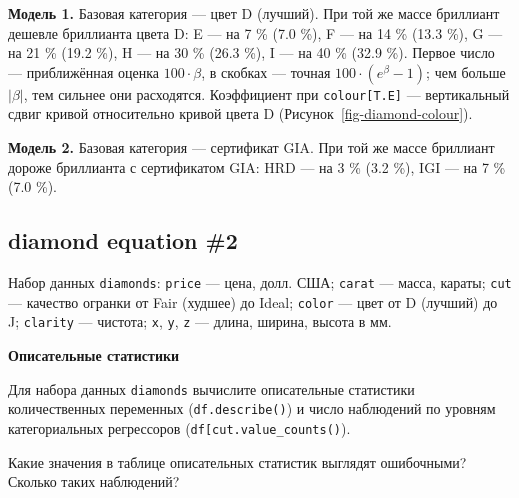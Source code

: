 \documentclass[
  russian,
]{article}
\begin{document}
\begin{tcolorbox}[enhanced jigsaw, arc=.35mm, bottomrule=.15mm, bottomtitle=1mm, breakable, colback=white, colbacktitle=quarto-callout-tip-color!10!white, colframe=quarto-callout-tip-color-frame, coltitle=black, left=2mm, leftrule=.75mm, opacityback=0, opacitybacktitle=0.6, rightrule=.15mm, title=\textcolor{quarto-callout-tip-color}{\faLightbulb}\hspace{0.5em}{Ответ}, titlerule=0mm, toprule=.15mm, toptitle=1mm]

\textbf{Модель 1.} Базовая категория --- цвет D (лучший). При той же
массе бриллиант дешевле бриллианта цвета D: E --- на 7 \% (7.0 \%), F
--- на 14 \% (13.3 \%), G --- на 21 \% (19.2 \%), H --- на 30 \% (26.3
\%), I --- на 40 \% (32.9 \%). Первое число --- приближённая оценка
\(100\cdot\beta\), в скобках --- точная \(100\cdot(e^{\beta}-1)\); чем
больше \(\lvert\beta\rvert\), тем сильнее они расходятся. Коэффициент
при \texttt{colour{[}T.E{]}} --- вертикальный сдвиг кривой относительно
кривой цвета D (Рисунок~\ref{fig-diamond-colour}).

\textbf{Модель 2.} Базовая категория --- сертификат GIA. При той же
массе бриллиант дороже бриллианта с сертификатом GIA: HRD --- на 3 \%
(3.2 \%), IGI --- на 7 \% (7.0 \%).

\end{tcolorbox}

\subsection{diamond equation \#2}\label{diamond-equation-2}

Набор данных \texttt{diamonds}: \texttt{price} --- цена, долл. США;
\texttt{carat} --- масса, караты; \texttt{cut} --- качество огранки от
Fair (худшее) до Ideal; \texttt{color} --- цвет от D (лучший) до J;
\texttt{clarity} --- чистота; \texttt{x}, \texttt{y}, \texttt{z} ---
длина, ширина, высота в мм.

\textbf{Описательные статистики}

Для набора данных \texttt{diamonds} вычислите описательные статистики
количественных переменных (\texttt{df.describe()}) и число наблюдений по
уровням категориальных регрессоров
(\texttt{df{[}\textquotesingle{}cut\textquotesingle{}{]}.value\_counts()}).

Какие значения в таблице описательных статистик выглядят ошибочными?
Сколько таких наблюдений?
\end{document}
